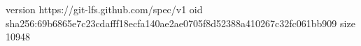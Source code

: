 version https://git-lfs.github.com/spec/v1
oid sha256:69b6865e7c23cdafff18ecfa140ae2ae0705f8d52388a410267c32fc061bb909
size 10948
